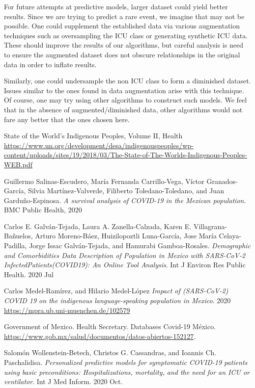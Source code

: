 \documentclass{article}
\begin{document}
For future attempts at predictive models, larger dataset could yield better results. Since we are trying to predict a rare event, we imagine that may not be possible. One could supplement the established data via various augmentation techniques such as oversampling the ICU class or generating synthetic ICU data. These should improve the results of our algorithms, but careful analysis is need to ensure the augmented dataset does not obscure relationships in the original data in order to inflate results. 

Similarly, one could undersample the non ICU class to form a diminished dataset. Issues similar to the ones found in data augmentation arise with this technique. Of course, one may try using other algorithms to construct such models. We feel that in the absence of augmented/diminished data, other algorithms would not fare any better that the ones chosen here. 

\begin{thebibliography}{7}

State of the World’s Indigenous Peoples, Volume II, Health 
\url{https://www.un.org/development/desa/indigenouspeoples/wp-content/uploads/sites/19/2018/03/The-State-of-The-Worlds-Indigenous-Peoples-WEB.pdf}

 Guillermo Salinas-Escudero, María Fernanda Carrillo-Vega, Víctor Granados-García, Silvia Martínez-Valverde, Filiberto Toledano-Toledano, and Juan Garduño-Espinosa. 
\emph{A survival analysis of COVID-19 in the Mexican population}. BMC Public Health, 2020  

 Carlos E. Galván-Tejada, Laura A. Zanella-Calzada, Karen E. Villagrana-Bañuelos, Arturo Moreno-Báez, Huizilopoztli Luna-García, Jose María Celaya-Padilla, Jorge Issac Galván-Tejada, and Hamurabi Gamboa-Rosales.
\emph{Demographic and Comorbidities Data Description of Population in Mexico with SARS-CoV-2 InfectedPatients(COVID19): An Online Tool Analysis}. Int J Environ Res Public Health. 2020 Jul

 Carlos Medel-Ramírez, and Hilario Medel-López \emph{Impact of (SARS-CoV-2) COVID 19 on the indigenous language-speaking population in Mexico}. 2020 
\url{https://mpra.ub.uni-muenchen.de/102579} 


 Government of Mexico. Health Secretary. Databases Covid-19 México.
\url{https://www.gob.mx/salud/documentos/datos-abiertos-152127}.  


 Salomón Wollenstein-Betech, Christos G. Cassandras, and Ioannis Ch. Paschalidisa. 
\emph{Personalized predictive models for symptomatic COVID-19 patients using basic preconditions: Hospitalizations, mortality, and the need for an ICU or ventilator}. Int J Med Inform. 2020 Oct.



\end{thebibliography}
\end{document}
